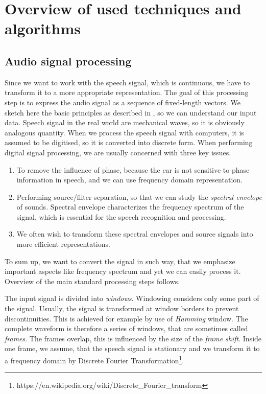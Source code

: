 \chapter{Overview of used techniques and algorithms}
\section{Audio signal processing}
\label{ASP-desc}
Since we want to work with the speech signal, which is continuous, we have to transform it to a more appropriate representation.
The goal of this processing step is to express the audio signal as a sequence of fixed-length vectors.
We sketch here the basic principles as described in \cite{taylor2009text}, so we can understand our input data.
Speech signal in the real world are mechanical waves, so it is obviously analogous quantity.
When we process the speech signal with computers, it is assumed to be digitised, so it is converted into discrete form.
When performing digital signal processing, we are usually concerned with three key issues.
\begin{enumerate}
\item To remove the influence of phase, because the ear is not sensitive to phase information in speech, and we can use frequency domain representation.
\item Performing source/filter separation, so that we can study the \textit{spectral envelope} of sounds.
Spectral envelope characterizes the frequency spectrum of the signal, which is essential for the speech recognition and processing.
\item We often wish to transform these spectral envelopes and source signals into more efficient representations.
\end{enumerate}
To sum up, we want to convert the signal in such way, that we emphasize important aspects like frequency spectrum and yet we can easily process it.
Overview of the main standard processing steps follows.
\par
The input signal is divided into \textit{windows}.
Windowing considers only some part of the signal.
Usually, the signal is transformed at window borders to prevent discontinuities.
This is achieved for example by use of \textit{Hamming} window.
The complete waveform is therefore a series of windows, that are sometimes called \textit{frames}.
The frames overlap, this is influenced by the size of the \textit{frame shift}.
Inside one frame, we assume, that the speech signal is stationary and we transform it to a frequency domain by Discrete Fourier Transformation\footnote{https://en.wikipedia.org/wiki/Discrete\_Fourier\_transform}.
